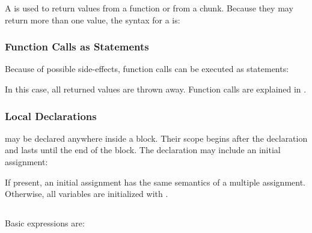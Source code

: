 \begin{Produc}
\end{Produc}

A  is used to return values from a function or from a chunk.
\label{return}
Because they may return more than one value,
the syntax for a  is:
\begin{Produc}
\end{Produc}

\subsubsection{Function Calls as Statements} \label{funcstat}
Because of possible side-effects,
function calls can be executed as statements:
\begin{Produc}
\end{Produc}%
In this case, all returned values are thrown away.
Function calls are explained in .

\subsubsection{Local Declarations} \label{localvar}
 may be declared anywhere inside a block.
Their scope begins after the declaration and lasts until the
end of the block.
The declaration may include an initial assignment:
\begin{Produc}
\end{Produc}%
If present, an initial assignment has the same semantics
of a multiple assignment.
Otherwise, all variables are initialized with \nil.


\subsection{}

\subsubsection{}
Basic expressions are:
\begin{Produc}
\end{Produc}%
\begin{Produc}
\end{Produc}%

